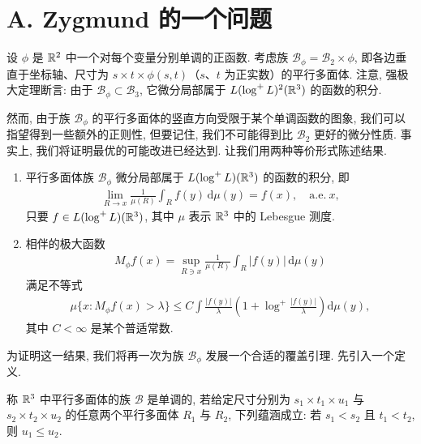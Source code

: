 \section{A. Zygmund 的一个问题}

设 $\phi$ 是 $\mathbb{R}^2$ 中一个对每个变量分别单调的正函数. 考虑族 $\mathcal{B}_\phi = \mathcal{B}_2 \times \phi$, 即各边垂直于坐标轴、尺寸为 $s \times t \times \phi(s, t)$（$s$、$t$ 为正实数）的平行多面体. 注意, 强极大定理断言: 由于 $\mathcal{B}_\phi \subset \mathcal{B}_3$, 它微分局部属于 $L(\log^{+}L)^2(\mathbb{R}^3)$ 的函数的积分.

然而, 由于族 $\mathcal{B}_{\phi}$ 的平行多面体的竖直方向受限于某个单调函数的图象, 我们可以指望得到一些额外的正则性, 但要记住, 我们不可能得到比 $\mathcal{B}_2$ 更好的微分性质. 事实上, 我们将证明最优的可能改进已经达到. 让我们用两种等价形式陈述结果.

\begin{theorem}\label{thm:2.8}
\begin{enumerate}
\item[(1)] 平行多面体族 $\mathcal{B}_\phi$ 微分局部属于 $L(\log^+L)(\mathbb{R}^3)$ 的函数的积分, 即
\begin{align*}
  \lim_{R\to x}\frac{1}{\mu(R)}\int_{R} f(y)\,\mathrm{d}\mu(y)=f(x),\quad\text{a.e.}\ x,
\end{align*}
只要 $f \in L(\log^{+}L)(\mathbb{R}^{3})$, 其中 $\mu$ 表示 $\mathbb{R}^{3}$ 中的 Lebesgue 测度.

\item[(2)] 相伴的极大函数
\begin{align*}
  M_{\phi}f(x)=\sup_{R\ni x}\frac{1}{\mu(R)}\int_{R}\left|f(y)\right|\,\mathrm{d}\mu(y)
\end{align*}
满足不等式
\begin{align*}
  \mu\{x:M_{\phi}f(x)>\lambda\}\leq C\int\frac{|f(y)|}{\lambda}\left(1+\log^{+}\frac{|f(y)|}{\lambda}\right)\mathrm{d}\mu(y),
\end{align*}
其中 $C < \infty$ 是某个普适常数.
\end{enumerate}
\end{theorem}

为证明这一结果, 我们将再一次为族 $\mathcal{B}_{\phi}$ 发展一个合适的覆盖引理. 先引入一个定义.

\begin{definition}\label{def:2.9}
称 $\mathbb{R}^3$ 中平行多面体的族 $\mathcal{B}$ 是单调的, 若给定尺寸分别为 $s_1 \times t_1 \times u_1$ 与 $s_2 \times t_2 \times u_2$ 的任意两个平行多面体 $R_1$ 与 $R_2$, 下列蕴涵成立: 若 $s_1 < s_2$ 且 $t_1 < t_2$, 则 $u_1 \leq u_2$.
\end{definition}


